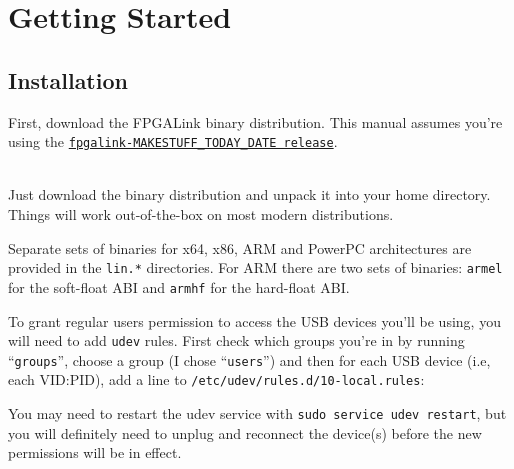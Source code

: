 \newpage
\section{Getting Started}

\subsection{Installation}
First, download the FPGALink binary distribution. This manual assumes you're using the \texttt{\href{http://www.swaton.ukfsn.org/bin/fpgalink-MAKESTUFF_TODAY_DATE/fpgalink-bin.tar.gz}{fpgalink-MAKESTUFF_TODAY_DATE release}}.

\begin{desc}
  \item[\sffamily{Linux:}] \hfill \\
    Just download the binary distribution and unpack it into your home directory. Things will work out-of-the-box on most modern distributions.

    Separate sets of binaries for x64, x86, ARM and PowerPC architectures are provided in the \texttt{lin.*} directories. For ARM there are two sets of binaries: \texttt{armel} for the soft-float ABI and \texttt{armhf} for the hard-float ABI.

    To grant regular users permission to access the USB devices you'll be using, you will need to add \texttt{udev} rules. First check which groups you're in by running ``\texttt{groups}'', choose a group (I chose ``\texttt{users}'') and then for each USB device (i.e, each VID:PID), add a line to \texttt{/etc/udev/rules.d/10-local.rules}:


    You may need to restart the udev service with \texttt{sudo service udev restart}, but you will definitely need to unplug and reconnect the device(s) before the new permissions will be in effect.


\end{desc}
